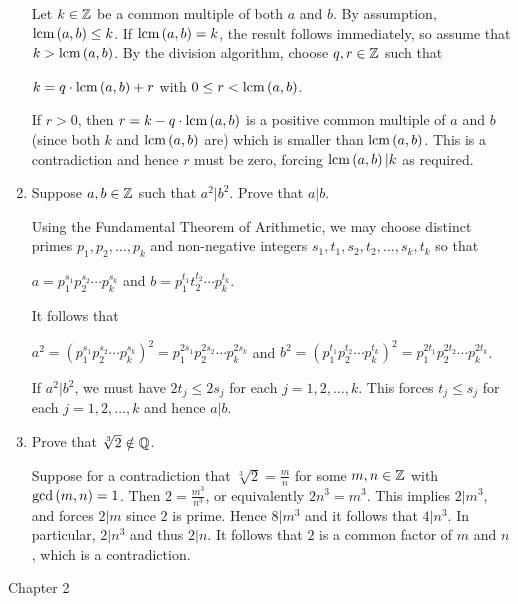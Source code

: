 \documentclass[11pt,fleqn,dvipsnames,usenames]{article}
\newcommand{\p}{\noindent}
\begin{document}
\begin{enumerate}
\solution Let $k\in\mathbb{Z}$ be a common multiple of both $a$ and $b$.  By assumption, $\text{lcm}\left(a,b\right)\leq k$.  If $\text{lcm}\left(a,b\right) = k$, the result follows immediately, so assume that $k > \text{lcm}\left(a,b\right)$.  By the division algorithm, choose $q,r\in\mathbb{Z}$ such that
\begin{center}
$k = q\cdot \text{lcm}\left(a,b\right) + r$ with $0\leq r < \text{lcm}\left(a,b\right)$.
\end{center}
\p If $r > 0$, then $r = k - q\cdot \text{lcm}\left(a,b\right)$ is a positive common multiple of $a$ and $b$ (since both $k$ and $\text{lcm}\left(a,b\right)$ are) which is smaller than $\text{lcm}\left(a,b\right)$.  This is a contradiction and hence $r$ must be zero, forcing $\text{lcm}\left(a,b\right)|k$ as required.

\item Suppose $a,b\in\mathbb{Z}$ such that $a^2|b^2$.  Prove that $a|b$.
\vsmsp

\solution Using the Fundamental Theorem of Arithmetic, we may choose distinct primes $p_{1},p_{2},\ldots, p_{k}$ and non-negative integers $s_{1},t_{1},s_{2},t_{2},\ldots,s_{k},t_{k}$ so that
\begin{center}
$a = p_{1}^{s_{1}}p_{2}^{s_{2}}\cdots p_{k}^{s_{k}}$ and $b = p_{1}^{t_{1}}t_{2}^{t_{2}}\cdots p_{k}^{t_{k}}$.
\end{center}
\p It follows that
\begin{center}
$a^2 = \left(p_{1}^{s_{1}}p_{2}^{s_{2}}\cdots p_{k}^{s_{k}}\right)^2 = p_{1}^{2s_{1}}p_{2}^{2s_{2}}\cdots p_{k}^{2s_{k}}$ and $b^2 = \left(p_{1}^{t_{1}}p_{2}^{t_{2}}\cdots p_{k}^{t_{k}}\right)^2 = p_{1}^{2t_{1}}p_{2}^{2t_{2}}\cdots p_{k}^{2t_{k}}$.
\end{center}
\p If $a^2|b^2$, we must have $2t_{j}\leq 2s_{j}$ for each $j=1,2,\ldots, k$.  This forces $t_{j}\leq s_{j}$ for each $j=1,2,\ldots, k$ and hence $a|b$.

\item Prove that $\sqrt[3]{2}\notin\mathbb{Q}$.
\vsmsp

\solution Suppose for a contradiction that $\sqrt[3]{2} = \frac{m}{n}$ for some $m,n\in\mathbb{Z}$ with $\text{gcd}\left(m,n\right)=1$.  Then $2 = \frac{m^3}{n^3}$, or equivalently $2n^3 = m^3$.  This implies $2|m^3$, and forces $2|m$ since $2$ is prime.  Hence $8|m^3$ and it follows that $4|n^3$.  In particular, $2|n^3$ and thus $2|n$.  It follows that $2$ is a common factor of $m$ and $n$, which is a contradiction.

\end{enumerate}
\vsp

{\huge Chapter 2}
\vsp
\end{document}
